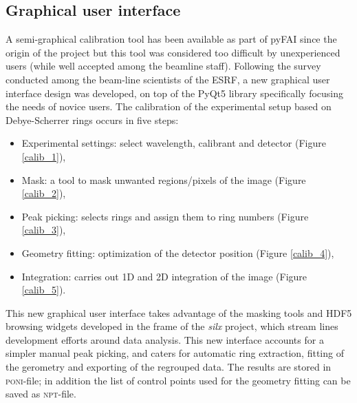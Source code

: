 \documentclass[preprint, pdf]{iucr}              %
\begin{document}
\subsection{Graphical user interface}

A semi-graphical calibration tool has been available as part of pyFAI
\cite{fv5028} since the origin of the project but this tool was considered too
difficult by unexperienced users (while well accepted among
the beamline staff).
Following the survey conducted among the beam-line scientists of the ESRF, a
new graphical user interface design was developed, on top of the PyQt5 library
\cite{pyqt} specifically focusing the needs of novice users.
The calibration of the experimental setup based on Debye-Scherrer rings 
occurs in five steps:
\begin{itemize}
  \item Experimental settings: select wavelength, calibrant and detector (Figure
  \ref{calib_1}),
  \item Mask: a tool to mask unwanted regions/pixels of the
  image (Figure \ref{calib_2}),
  \item Peak picking: selects rings and assign them to ring numbers (Figure
  \ref{calib_3}),
  \item Geometry fitting: optimization of the detector position (Figure
  \ref{calib_4}), 
  \item Integration: carries out 1D and 2D integration of the image (Figure
  \ref{calib_5}). 
\end{itemize}

This new graphical user interface takes advantage of the masking tools and HDF5
browsing widgets developed in the frame of the \textit{silx} \cite{silx}
project, which stream lines development efforts around data analysis.
This new interface accounts for a simpler manual peak picking, and caters for
automatic ring extraction, fitting of the gerometry and exporting of the
regrouped data.
The results are stored in \textsc{poni}-file; in
addition the list of control points used for the geometry fitting can be saved as \textsc{npt}-file.
\end{document}
